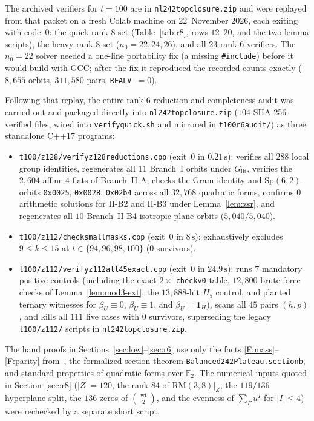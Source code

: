 \documentclass[11pt]{article}
\theoremstyle{definition}
\theoremstyle{remark}
\newcommand{\F}{\mathbb{F}}
\newcommand{\wt}{\operatorname{wt}}
\newcommand{\ind}{\mathbf{1}}
\newcommand{\RM}{\mathrm{RM}}
\newcommand{\code}[1]{\texttt{#1}}
\DeclareRobustCommand{\_}{\textunderscore\allowbreak}
\newcommand{\main}{\cite{Main}}
\begin{document}
The archived verifiers for $t=100$ are in \code{nl242\_top\_closure.zip} and were replayed from that packet on a fresh Colab machine on 22~November 2026, each exiting with code~$0$: the quick rank-$8$ set (Table~\ref{tab:r8}, rows $12$--$20$, and the two lemma scripts), the heavy rank-$8$ set ($n_0=22,24,26$), and all $23$ rank-$6$ verifiers. The $n_0=22$ solver needed a one-line portability fix (a missing \code{\#include}) before it would build with GCC; after the fix it reproduced the recorded counts exactly ($8{,}655$ orbits, $311{,}580$ pairs, \code{REAL\_V}~$=0$).

Following that replay, the entire rank-$6$ reduction and completeness audit was carried out and packaged directly into \code{nl242\_top\_closure.zip} ($104$ SHA-256-verified files, wired into \code{verify\_quick.sh} and mirrored in \code{t100\_r6\_audit/}) as three standalone C++17 programs:
\begin{itemize}[nosep]
\item \code{t100/z128/verify\_z128\_reductions.cpp} (exit~$0$ in $0.21\,\mathrm{s}$): verifies all $288$ local group identities, regenerates all $11$ Branch~I orbits under $G_{\mathrm{lit}}$, verifies the $2{,}604$ affine $4$-flats of Branch~II-A, checks the Gram identity and $\mathrm{Sp}(6,2)$-orbits \code{0x0025}, \code{0x0028}, \code{0x02b4} across all $32{,}768$ quadratic forms, confirms $0$ arithmetic solutions for II-B2 and II-B3 under Lemma~\ref{lem:zsr}, and regenerates all $10$ Branch~II-B4 isotropic-plane orbits ($5{,}040/5{,}040$).
\item \code{t100/z112/check\_small\_masks.cpp} (exit~$0$ in $8\,\mathrm{s}$): exhaustively excludes $9\le k\le 15$ at $t\in\{94,96,98,100\}$ ($0$ survivors).
\item \code{t100/z112/verify\_z112\_all45\_exact.cpp} (exit~$0$ in $24.9\,\mathrm{s}$): runs $7$ mandatory positive controls (including the exact $2\times$ \code{check\_v0} table, $12{,}800$ brute-force checks of Lemma~\ref{lem:mod3-ext}, the $13{,}888$-hit $H_5$ control, and planted ternary witnesses for $\beta_U\equiv0$, $\beta_U\equiv1$, and $\beta_U=\ind_H$), scans all $45$ pairs $(h,p)$, and kills all $111$ live cases with $0$ survivors, superseding the legacy \code{t100/z112/} scripts in \code{nl242\_top\_closure.zip}.
\end{itemize}

The hand proofs in Sections~\ref{sec:low}--\ref{sec:r6} use only the facts \ref{F:mass}--\ref{F:parity} from~\main{}, the formalized section theorem \code{Balanced242Plateau.section\_0\_b\_0}, and standard properties of quadratic forms over $\F_2$. The numerical inputs quoted in Section~\ref{sec:r8} ($|Z|=120$, the rank $84$ of $\RM(3,8)|_Z$, the $119/136$ hyperplane split, the $136$ zeros of $\binom{\wt}{2}$, and the evenness of $\sum_Fu^I$ for $|I|\le4$) were rechecked by a separate short script.
\end{document}
